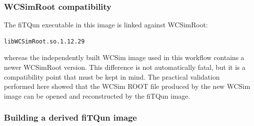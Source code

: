 \documentclass{article}
\numberwithin{table}{subsection}
\numberwithin{figure}{subsection}
\numberwithin{equation}{subsection}
\numberwithin{footnote}{subsection}
\begin{document}
\subsubsection{WCSimRoot compatibility}
The fiTQun executable in this image is linked against WCSimRoot:
\begin{lstlisting}[style=terminal]
libWCSimRoot.so.1.12.29
\end{lstlisting}
whereas the independently built WCSim image used in this workflow contains a newer WCSimRoot version. This difference is not automatically fatal, but it is a compatibility point that must be kept in mind. The practical validation performed here showed that the WCSim ROOT file produced by the new WCSim image can be opened and reconstructed by the fiTQun image.

\subsubsection{Building a derived fiTQun image}
\label{subsec:fitqun_derived_image}
\end{document}
